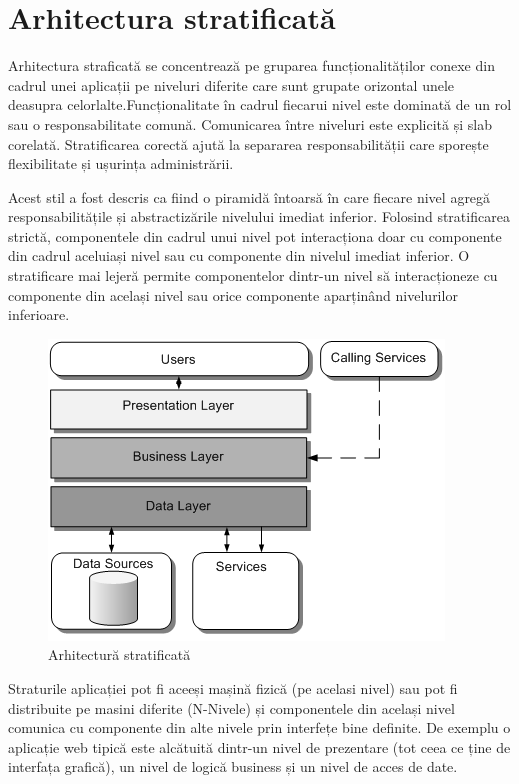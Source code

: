\documentclass[12pt, a4paper, oneside, romanian]{teza-upb}
\begin{document}
\section{Arhitectura stratificată}

Arhitectura straficată se concentrează pe gruparea funcționalităților conexe din cadrul unei aplicații pe niveluri diferite care sunt grupate orizontal unele deasupra celorlalte.Funcționalitate în cadrul fiecarui nivel este dominată de un rol sau o responsabilitate comună. Comunicarea între niveluri este explicită și slab corelată. Stratificarea corectă ajută la separarea responsabilității care sporește flexibilitate și ușurința administrării.

Acest stil a fost descris ca fiind o piramidă întoarsă în care fiecare nivel agregă responsabilitățile și abstractizările nivelului imediat inferior. Folosind stratificarea strictă, componentele din cadrul unui nivel pot interacționa doar cu componente din cadrul aceluiași nivel sau cu componente din nivelul imediat inferior. O stratificare mai lejeră permite componentelor dintr-un nivel să interacționeze cu componente din același nivel sau orice componente aparținând nivelurilor inferioare.

\begin{figure}[ht]
\centering
\includegraphics[scale=0.5]{img/layered-arch.PNG}
\caption{Arhitectură stratificată}
\label{fig:arhi_componente}
\end{figure}

Straturile aplicației pot fi aceeși mașină fizică (pe acelasi nivel) sau pot fi distribuite pe masini diferite (N-Nivele) și componentele din același nivel comunica cu componente din alte nivele prin interfețe bine definite. De exemplu o aplicație web tipică este alcătuită dintr-un nivel de prezentare (tot ceea ce ține de interfața grafică), un nivel de logică business și un nivel de acces de date. 
\end{document}
